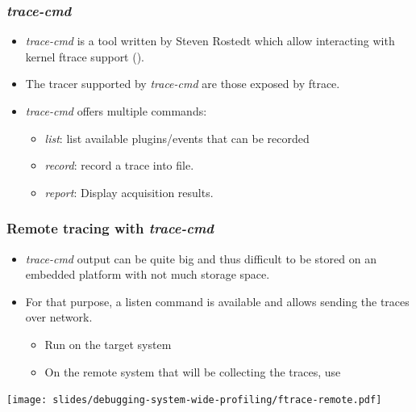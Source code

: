 \begin{frame}
  \frametitle{{\em trace-cmd}}
  \begin{itemize}
    \item {\em trace-cmd} is a tool written by Steven Rostedt which allow
          interacting with kernel ftrace support ().
    \item The tracer supported by {\em trace-cmd} are those exposed by ftrace.
    \item {\em trace-cmd} offers multiple commands:
    \begin{itemize}
      \item {\em list}: list available plugins/events that can be recorded
      \item {\em record}: record a trace into  file.
      \item {\em report}: Display  acquisition results.
    \end{itemize}
  \end{itemize}
\end{frame}

\begin{frame}
  \frametitle{Remote tracing with {\em trace-cmd}}
  \begin{itemize}
    \item {\em trace-cmd} output can be quite big and thus difficult to be
          stored on an embedded platform with not much storage space.
    \item For that purpose, a listen command is available and allows sending
          the traces over network.
    \begin{itemize}
      \item Run  on the target system
      \item On the remote system that will be collecting the traces, use 
    \end{itemize}
  \end{itemize}
  \center\texttt{[image: slides/debugging-system-wide-profiling/ftrace-remote.pdf]}
\end{frame}

